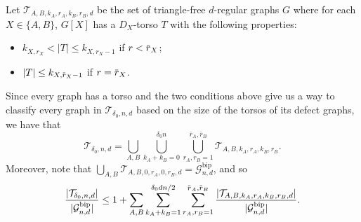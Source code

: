 \documentclass[11pt]{article}
\newcommand{\jca}[1]{{\color{OliveGreen}[Jane May 17: #1]}}
\newcommand{\overbar}[1]{\mkern 1.5mu\overline{\mkern-1.5mu#1\mkern-1.5mu}\mkern 1.5mu}
\theoremstyle{plain}
\begin{document}

Let $\mathcal T_{A,B,k_{A},{r_A}, k_{B},{r_B}, d}$ be the set of triangle-free $d$-regular graphs $G$ where for each $X\in \{A,B\}$, $G[X]$ has a $D_X$-torso $T$ with the following properties:
 \begin{itemize}
     \item $k_{X, r_X} < |T| \leq k_{X, r_X-1}$ if $r < \overbar r_{X}$;
     \item  $|T| \leq k_{X, \overbar{r}_{X}-1}$ if $r = \overbar r_{X}$.
 \end{itemize} 
 
Since every graph has a torso and the two conditions above give us a way to classify every graph in $\mathcal T_{\delta_0,n,d}$ based on the size of the torsos of its defect graphs, we have that 
\[
\mathcal T_{\delta_0, n, d} = \bigcup_{A,B}\bigcup_{k_A+ k_B = 0}^{\delta_0 n}\bigcup_{r_A, r_B = 1}^{\bar r_A, \bar r_B}\mathcal T_{A, B, k_A, r_A, k_B, r_B}.
\]
Moreover, note that
$\bigcup_{A,B}\mathcal T_{A,B,0, r_A, 0,r_B, d} = \mathcal G_{n,d}^\text{bip}$, and so
\begin{equation}\label{eq: main counting}
    \frac{|\mathcal T_{\delta_0, n, d}|}{|\mathcal G_{n,d}^\text{bip}|} \leq 1 + \sum_{A,B}\sum_{k_A + k_B = 1}^{\delta_0dn/2}  \sum_{r_A, r_B = 1}^{\overbar{r}_{A}, \overbar{r}_{B}}\frac{|\mathcal T_{A, B, k_{A}, {r_A},k_{B}, {r_B}, d}|}{|\mathcal G_{n,d}^{\text{bip}}|}.
\end{equation}
\end{document}

